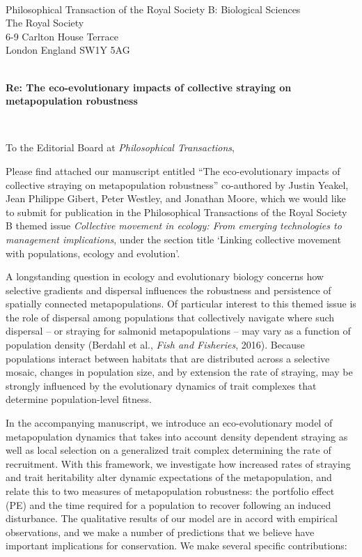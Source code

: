\documentclass[ucm,12pt]{ucletter}
\begin{document}
\begin{letter}{
    \\ Philosophical Transaction of the Royal Society B: Biological Sciences\\
    The Royal Society\\
    6-9 Carlton House Terrace\\
    London England SW1Y 5AG\\ \\
    \vspace{1mm}
    \centerline{\bf{Re: The eco-evolutionary impacts of collective straying on metapopulation robustness}} \\
}


\opening{To the Editorial Board at \emph{Philosophical Transactions},}



Please find attached our manuscript entitled ``The eco-evolutionary impacts of collective straying on metapopulation robustness'' co-authored by Justin Yeakel, Jean Philippe Gibert, Peter Westley, and Jonathan Moore, which we would like to submit for publication in the Philosophical Transactions of the Royal Society B themed issue \emph{Collective movement in ecology: From emerging technologies to management implications}, under the section title `Linking collective movement with populations, ecology and evolution'.


A longstanding question in ecology and evolutionary biology concerns how selective gradients and dispersal influences the robustness and persistence of spatially connected metapopulations.
Of particular interest to this themed issue is the role of dispersal among populations that collectively navigate where such dispersal -- or straying for salmonid metapopulations -- may vary as a function of population density (Berdahl et al., \emph{Fish and Fisheries}, 2016).
Because populations interact between habitats that are distributed across a selective mosaic, changes in population size, and by extension the rate of straying, may be strongly influenced by the evolutionary dynamics of trait complexes that determine population-level fitness.

In the accompanying manuscript, we introduce an eco-evolutionary model of metapopulation dynamics that takes into account density dependent straying as well as local selection on a generalized trait complex determining the rate of recruitment.
With this framework, we investigate how increased rates of straying and trait heritability alter dynamic expectations of the metapopulation, and relate this to two measures of metapopulation robustness: the portfolio effect (PE) and the time required for a population to recover following an induced disturbance.
The qualitative results of our model are in accord with empirical observations, and we make a number of predictions that we believe have important implications for conservation.
We make several specific contributions:



\end{letter}
\end{document}
